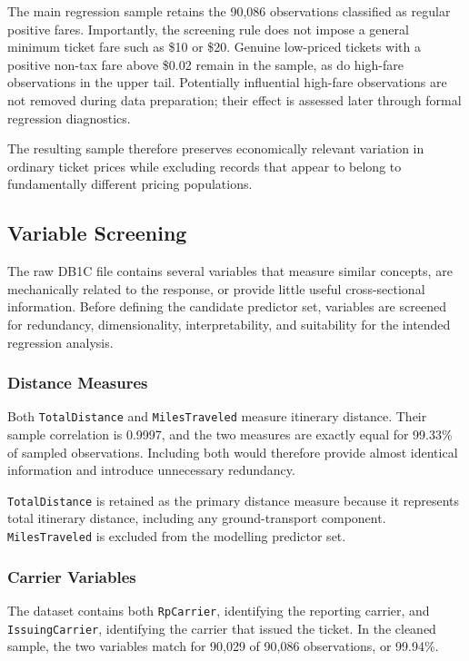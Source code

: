 \documentclass[11pt,a4paper]{article}
\begin{document}
The main regression sample retains the 90,086 observations classified as regular positive fares. Importantly, the screening rule does not impose a general minimum ticket fare such as \$10 or \$20. Genuine low-priced tickets with a positive non-tax fare above \$0.02 remain in the sample, as do high-fare observations in the upper tail. Potentially influential high-fare observations are not removed during data preparation; their effect is assessed later through formal regression diagnostics.

The resulting sample therefore preserves economically relevant variation in ordinary ticket prices while excluding records that appear to belong to fundamentally different pricing populations.

\subsection{Variable Screening}

The raw DB1C file contains several variables that measure similar concepts, are mechanically related to the response, or provide little useful cross-sectional information. Before defining the candidate predictor set, variables are screened for redundancy, dimensionality, interpretability, and suitability for the intended regression analysis.

\subsubsection{Distance Measures}

Both \texttt{TotalDistance} and \texttt{MilesTraveled} measure itinerary distance. Their sample correlation is 0.9997, and the two measures are exactly equal for 99.33\% of sampled observations. Including both would therefore provide almost identical information and introduce unnecessary redundancy.

\texttt{TotalDistance} is retained as the primary distance measure because it represents total itinerary distance, including any ground-transport component. \texttt{MilesTraveled} is excluded from the modelling predictor set.

\subsubsection{Carrier Variables}

The dataset contains both \texttt{RpCarrier}, identifying the reporting carrier, and \texttt{IssuingCarrier}, identifying the carrier that issued the ticket. In the cleaned sample, the two variables match for 90,029 of 90,086 observations, or 99.94\%.
\end{document}
